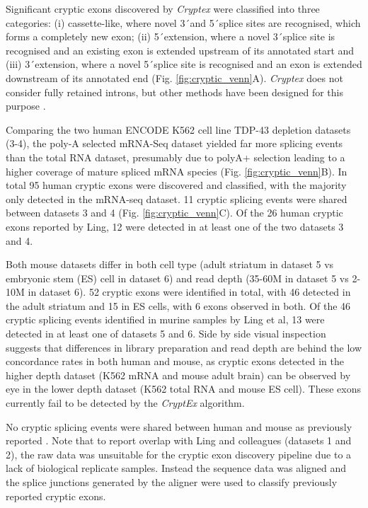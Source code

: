 Significant cryptic exons discovered by \textit{Cryptex} were classified into three categories: (i) cassette-like, where novel 3\'\ and 5\'\ splice sites are recognised, which forms a completely new exon; (ii) 5\'\ extension, where a novel 3\'\ splice site is recognised and an existing exon is extended upstream of its annotated start and (iii) 3\'\ extension, where a novel 5\'\ splice site is recognised and an exon is extended downstream of its annotated end (Fig. \ref{fig:cryptic_venn}A). 
\textit{Cryptex} does not consider fully retained introns, but other methods have been designed for this purpose \citep{Li2015a,Bai2015-aq,Braunschweig2014}.

Comparing the two human ENCODE K562 cell line TDP-43 depletion datasets (3-4), the poly-A selected mRNA-Seq dataset yielded far more splicing events than the total RNA dataset, presumably due to polyA+ selection leading to a higher coverage of mature spliced mRNA species (Fig. \ref{fig:cryptic_venn}B). In total 95 human cryptic exons were discovered and classified, with the majority only detected in the mRNA-seq dataset. 11 cryptic splicing events were shared between datasets 3 and 4 (Fig. \ref{fig:cryptic_venn}C). Of the 26 human cryptic exons reported by Ling, 12 were detected in at least one of the two datasets 3 and 4. 

Both mouse datasets differ in both cell type (adult striatum in dataset 5 vs embryonic stem (ES) cell in dataset 6) and read depth (35-60M in dataset 5 vs 2-10M in dataset 6). 52  cryptic exons were identified in total, with 46 detected in the adult striatum and 15 in ES cells, with 6 exons observed in both. Of the 46 cryptic splicing events identified in murine samples by Ling et al, 13 were detected in at least one of datasets 5 and 6. Side by side visual inspection suggests that differences in library preparation and read depth are behind the low  concordance rates in both human and mouse, as cryptic exons detected in the higher depth dataset (K562 mRNA and mouse adult brain) can be observed by eye in the lower depth dataset (K562 total RNA and mouse ES cell). These exons currently fail to be detected by the \emph{CryptEx} algorithm.

No cryptic splicing events were shared between human and mouse as previously reported \citep{Ling2015}. Note that to report overlap with Ling and colleagues (datasets 1 and 2), the raw data was unsuitable for the cryptic exon discovery pipeline due to a lack of biological replicate samples. Instead the sequence data was aligned and the splice junctions generated by the aligner were used to classify previously reported cryptic exons.

